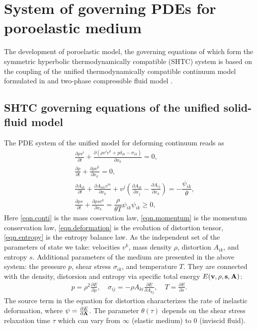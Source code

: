 \documentclass[3p,times]{elsarticle}
\begin{document}
\section{System of governing PDEs for poroelastic medium}

The development of poroelastic model, the governing equations of which form the symmetric 
hyperbolic thermodynamically compatible (SHTC) system is based on the coupling of 
the unified thermodynamically compatible continuum model formulated in \cite{Dumbser2016} and two-phase compressible fluid model \cite{Romenski2010}. 

\subsection{SHTC governing equations of the unified solid-fluid model}

The PDE system of the unified model for deforming continuum reads as 
\begin{eqnarray} \label{eqn.HPR}
	&&\displaystyle\frac{\partial \rho v^i}{\partial t}+\frac{\partial 
		\left(\rho v^i v^k + p \delta_{ik} - \sigma_{ik} \right)}{\partial x_k}=0, 
	\label{eqn.momentum}\\[2mm]
	&& \frac{\partial \rho}{\partial t}+\frac{\partial \rho v^k}{\partial 
	x_k}=0,\label{eqn.conti}\\[2mm]
	&&\displaystyle\frac{\partial A_{i k}}{\partial t}+\frac{\partial A_{im} 
		v^m}{\partial x_k}+v^j\left(\frac{\partial A_{ik}}{\partial 
		x_j}-\frac{\partial A_{ij}}{\partial x_k}\right)
	=-\dfrac{ \psi_{ik} }{\theta},\label{eqn.deformation}\\[2mm]
	&&\displaystyle\frac{\partial \rho s}{\partial t}+\frac{\partial \rho 
		s v^k }{\partial x_k}=\dfrac{\rho}{\theta T} 
	\psi_{ik} \psi_{ik} \geq0, 
	\label{eqn.entropy}
\end{eqnarray}
Here \eqref{eqn.conti} is the mass coservation law, \eqref{eqn.momentum} is the momentum conservation law, \eqref{eqn.deformation} is the evolution of distortion tensor, \eqref{eqn.entropy} is the entropy balance law.
As the independent set of the parameters of state we take:
velocities $v^k$, mass density $\rho$, distortion $A_{ik}$, and entropy $s$.
Additional parameters of the medium are presented in the above system: the pressure $p$, shear stress $\sigma_{ik}$, and temperature $T$. They are connected with the density, distorsion and entropy via specific total energy $E(\bf{v},\rho,s,\bf{A})$:
\begin{align}
p=\rho^2\frac{\partial E}{\partial \rho}, \quad 
\sigma_{ij}=-\rho A_{ki}\frac{\partial E}{\partial A_{kj}}, \quad 
T=\frac{\partial E}{\partial s}.
\end{align}
The source term in the equation for distortion characterizes the rate of inelastic deformation,
where ${\bf{\psi}}=\frac{\partial E}{\partial {\bf{A}}}$.
The parameter $\theta(\tau)$ depends on the shear stress relaxation time $\tau$ which can vary from $\infty$ (elastic medium) to $0$ (inviscid fluid).
\end{document}
